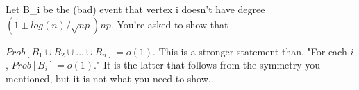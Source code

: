 
Let B_i be the (bad) event that vertex i doesn't have degree $(1 \pm log(n)/\sqrt{np})np$. You're asked to show that

$Prob [B_1 \cup B_2 \cup ... \cup B_n ] = o(1)$. This is a stronger statement than, "For each $i$, $Prob[B_i] = o(1)$." It is the latter that follows from the symmetry you mentioned, but it is not what you need to show...
